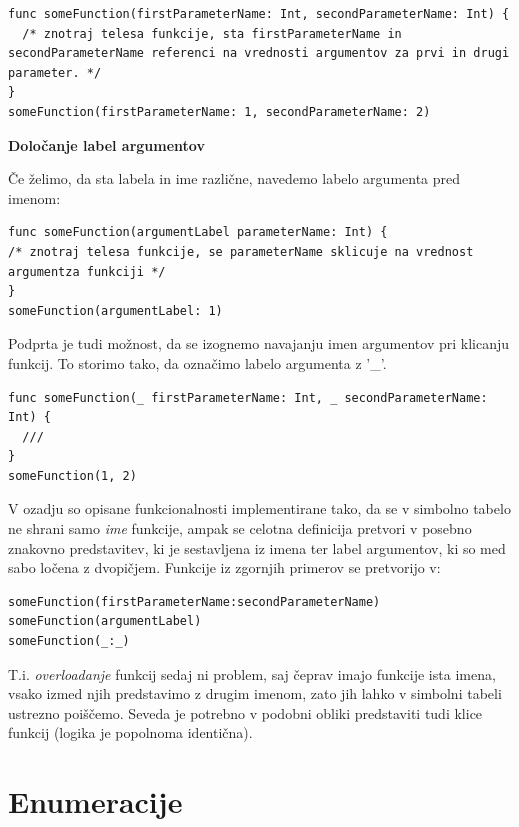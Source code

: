 \documentclass[a4paper, 12pt]{book}
\begin{document}
\begin{lstlisting}[caption={Primer definicije in klica funkcije v programskem jeziku Atheris}, captionpos=b]
func someFunction(firstParameterName: Int, secondParameterName: Int) {
  /* znotraj telesa funkcije, sta firstParameterName in secondParameterName referenci na vrednosti argumentov za prvi in drugi parameter. */
}
someFunction(firstParameterName: 1, secondParameterName: 2)
\end{lstlisting}

\textbf{Določanje label argumentov}

Če želimo, da sta labela in ime različne, navedemo labelo argumenta pred imenom:

\begin{lstlisting}[caption={Labela argumenta in ime parametra se razlikujeta}, captionpos=b]
func someFunction(argumentLabel parameterName: Int) {
/* znotraj telesa funkcije, se parameterName sklicuje na vrednost argumentza funkciji */
}
someFunction(argumentLabel: 1) 
\end{lstlisting}

Podprta je tudi možnost, da se izognemo navajanju imen argumentov pri klicanju funkcij. To storimo tako, da označimo labelo argumenta z '\_'.

\begin{lstlisting}[caption={}, captionpos=b]
func someFunction(_ firstParameterName: Int, _ secondParameterName: Int) {
  ///
}
someFunction(1, 2)
\end{lstlisting}

V ozadju so opisane funkcionalnosti implementirane tako, da se v simbolno tabelo ne shrani samo \textit{ime} funkcije, ampak se celotna definicija pretvori v posebno znakovno predstavitev, ki je sestavljena iz imena ter label argumentov, ki so med sabo ločena z dvopičjem. Funkcije iz zgornjih primerov se pretvorijo v:
\begin{lstlisting}[caption={Znakovne predstavitve funkcij}, captionpos=b]
someFunction(firstParameterName:secondParameterName)
someFunction(argumentLabel)
someFunction(_:_)
\end{lstlisting}

T.i. \textit{overloadanje} funkcij sedaj ni problem, saj čeprav imajo funkcije ista imena, vsako izmed njih predstavimo z drugim imenom, zato jih lahko v simbolni tabeli ustrezno poiščemo. Seveda je potrebno v podobni obliki predstaviti tudi klice funkcij (logika je popolnoma identična).


\section{Enumeracije}
\end{document}
